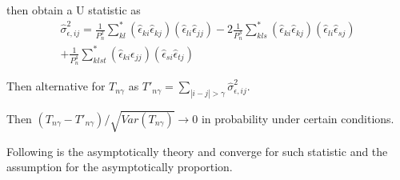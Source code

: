 \documentclass{beamer}
\begin{document}
\begin{frame}
 then obtain a U statistic as 
 \begin{align}
\hat { \sigma } _ { \epsilon , i j } ^ { 2 } = \frac { 1 } { P _ { n } ^ { 2 } } \sum _ { k l } ^ { * } \left( \hat { \epsilon } _ { k i } \hat { \epsilon } _ { k j } \right) \left( \hat { \epsilon } _ { l i } \hat { \epsilon } _ { j j } \right) - 2 \frac { 1 } { P _ { n } ^ { 3 } } \sum _ { k l s } ^ { * } \left( \hat { \epsilon } _ { k i } \hat { \epsilon } _ { k j } \right) \left( \hat { \epsilon } _ { l i } \hat { \epsilon } _ { s j } \right) \\
+ \frac { 1 } { P _ { n } ^ { 4 } } \sum _ { k l s t } ^ { * } \left( \hat { \epsilon } _ { k i } \epsilon _ { j j } \right) \left( \hat { \epsilon } _ { s i } \hat { \epsilon } _ { t j } \right) 
 \end{align}
\end{frame}

\begin{frame}

Then alternative for \(T_{n\gamma}\) as
\(T'_{n\gamma}= \sum _ { | i - j | > \gamma } \hat { \sigma } _ { \epsilon , i j } ^ { 2 }\).

Then \((T_{n\gamma}-T'_{n\gamma})/\sqrt{Var(T_{n\gamma})}\rightarrow 0\)
in probability under certain conditions.

Following is the asymptotically theory and converge for such statistic
and the assumption for the asymptotically proportion.

\end{frame}
\end{document}

